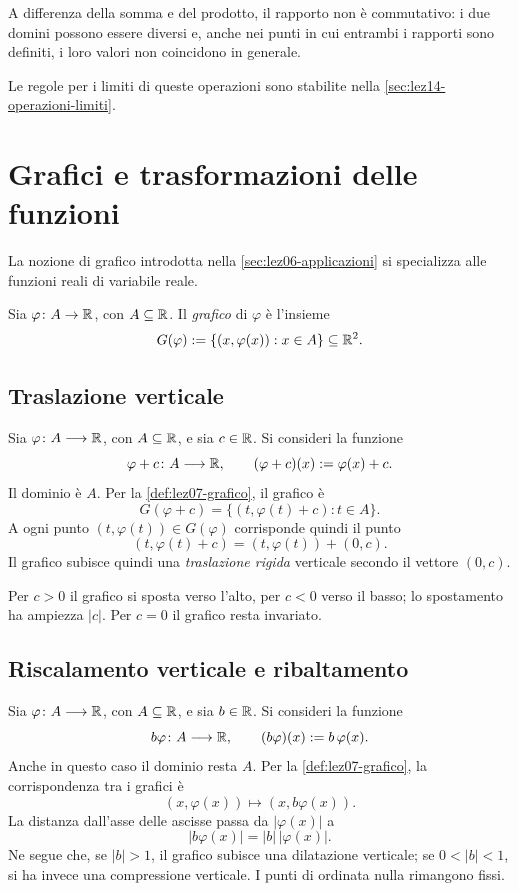 A differenza della somma e del prodotto, il rapporto
non è commutativo: i due domini possono essere
diversi e, anche nei punti in cui entrambi i
rapporti sono definiti, i loro valori non
coincidono in generale.

Le regole per i limiti di queste operazioni sono stabilite
nella \cref{sec:lez14-operazioni-limiti}.

\section{Grafici e trasformazioni delle funzioni}
\label{sec:lez07-trasformazioni}

La nozione di grafico introdotta nella
\cref{sec:lez06-applicazioni} si specializza alle funzioni
reali di variabile reale.

\begin{definition}
\label{def:lez07-grafico}
Sia \(\varphi\colon A\to\mathbb{R}\), con \(A\subseteq\mathbb{R}\).
Il \emph{grafico} di \(\varphi\) è l'insieme
\[
  G(\varphi):=\{(x,\varphi(x)):x\in A\}
  \subseteq\mathbb{R}^2.
\]
\end{definition}

\subsection{Traslazione verticale}
\label{sec:lez07-traslazioni-verticali}

Sia \(\varphi\colon A\longrightarrow\mathbb{R}\), con
\(A\subseteq\mathbb{R}\), e sia \(c\in\mathbb{R}\). Si consideri
la funzione
\[
  \varphi+c\colon A\longrightarrow\mathbb{R},
  \qquad
  (\varphi+c)(x):=\varphi(x)+c.
\]
Il dominio è \(A\). Per la \cref{def:lez07-grafico},
il grafico è
\[
  G(\varphi+c)=\{(t,\varphi(t)+c):t\in A\}.
\]
A ogni punto \((t,\varphi(t))\in G(\varphi)\)
corrisponde quindi il punto
\[
  (t,\varphi(t)+c)
  =(t,\varphi(t))+(0,c).
\]
Il grafico subisce quindi una \emph{traslazione rigida}
verticale secondo il vettore \((0,c)\).

Per \(c>0\) il grafico si sposta verso l'alto,
per \(c<0\) verso il basso; lo spostamento ha
ampiezza \(|c|\). Per \(c=0\) il grafico resta invariato.

\subsection{Riscalamento verticale e ribaltamento}
\label{sec:lez07-riscalamento}

Sia \(\varphi\colon A\longrightarrow\mathbb{R}\), con
\(A\subseteq\mathbb{R}\), e sia \(b\in\mathbb{R}\). Si consideri
la funzione
\[
  b\varphi\colon A\longrightarrow\mathbb{R},
  \qquad
  (b\varphi)(x):=b\,\varphi(x).
\]
Anche in questo caso il dominio resta \(A\).
Per la \cref{def:lez07-grafico}, la corrispondenza
tra i grafici è
\[
  (x,\varphi(x))\longmapsto(x,b\varphi(x)).
\]
La distanza dall'asse delle ascisse
passa da \(|\varphi(x)|\) a
\[
  |b\varphi(x)|=|b|\,|\varphi(x)|.
\]
Ne segue che, se \(|b|>1\), il grafico subisce
una dilatazione verticale; se \(0<|b|<1\), si ha
invece una compressione verticale. I punti di
ordinata nulla rimangono fissi.

